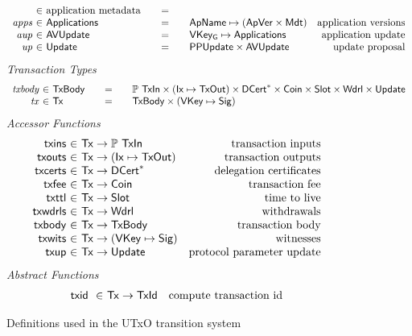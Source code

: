 \begin{figure*}[htb]
\begin{equation*}
\begin{array}{r@{~\in~}l@{\qquad=\qquad}lr}
      & \text{application metadata}
      \\
      \var{apps}
      & \Applications
      & \ApName \mapsto (\ApVer \times \Metadata)
      & \text{application versions}
      \\
      \var{aup}
      & \AVUpdate
      & \VKeyGen \mapsto \Applications
      & \text{application update}
      \\
      \var{up}
      & \Update
      & \PPUpdate \times \AVUpdate
      & \text{update proposal}
    \end{array}
  \end{equation*}
  \emph{Transaction Types}
  \begin{equation*}
    \begin{array}{r@{~\in~}l@{\qquad=\qquad}l}
      \var{txbody}
      & \TxBody
      & \powerset{\TxIn} \times (\Ix \mapsto \TxOut) \times \seqof{\DCert}
        \times \Coin \times \Slot \times \Wdrl \times \Update
      \\
      \var{tx}
      & \Tx
      & \TxBody \times (\VKey \mapsto \Sig)
      \\
    \end{array}
  \end{equation*}
  \emph{Accessor Functions}
  \begin{equation*}
    \begin{array}{r@{~\in~}lr}
      \fun{txins} & \Tx \to \powerset{\TxIn} & \text{transaction inputs} \\
      \fun{txouts} & \Tx \to (\Ix \mapsto \TxOut) & \text{transaction outputs} \\
      \fun{txcerts} & \Tx \to \seqof{\DCert} & \text{delegation certificates} \\
      \fun{txfee} & \Tx \to \Coin & \text{transaction fee} \\
      \fun{txttl} & \Tx \to \Slot & \text{time to live} \\
      \fun{txwdrls} & \Tx \to \Wdrl & \text{withdrawals} \\
      \fun{txbody} & \Tx \to \TxBody & \text{transaction body}\\
      \fun{txwits} & \Tx \to (\VKey \mapsto \Sig) & \text{witnesses} \\
      \fun{txup} & \Tx \to \Update & \text{protocol parameter update} \\
    \end{array}
  \end{equation*}
  \emph{Abstract Functions}
  \begin{equation*}
    \begin{array}{r@{~\in~}lr}
      \txid{} & \Tx \to \TxId & \text{compute transaction id}\\
    \end{array}
  \end{equation*}
  \caption{Definitions used in the UTxO transition system}
  \label{fig:defs:utxo-shelley}
\end{figure*}

\clearpage
